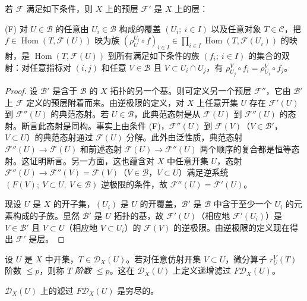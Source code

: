 \begin{lemma}
若 $\mathcal{F}$ 满足如下条件，则 $X$ 上的预层 $\mathcal{F}'$ 是 $X$ 上的层：

(F) 对 $U\in\mathcal{B}$ 的任意由 $U_i\in\mathcal{B}$ 构成的覆盖 $(U_i;\ i\in I)$ 以及任意对象 $T\in\mathcal{C}$，把 $f\in\operatorname{Hom}(T,\mathcal{F}(U))$ 映为族 $(\rho^{U_i}_U\circ f)_{i\in I}\in\prod_{i\in I}\operatorname{Hom}(T,\mathcal{F}(U_i))$ 的映射，是 $\operatorname{Hom}(T,\mathcal{F}(U))$ 到所有满足如下条件的族 $(f_i;\ i\in I)$ 的集合的双射：对任意指标对 $(i,j)$ 和任意 $V\in\mathcal{B}$ 且 $V\subset U_i\cap U_j$，有 $\rho^{V}_{U_j}\circ f_i=\rho^V_{U_i}\circ f_j$。
\end{lemma}

\begin{proof}
设 $\mathcal{B}'$ 是含于 $\mathcal{B}$ 的 $X$ 拓扑的另一个基。则可定义另一个预层 $\mathcal{F}''$，它由 $\mathcal{B}'$ 上 $\mathcal{F}$ 定义的预层附着而来。由逆极限的定义，对 $X$ 上任意开集 $U$ 存在 $\mathcal{F}'(U)$ 到 $\mathcal{F}''(U)$ 的典范态射。若 $U\in\mathcal{B}$，此典范态射是从 $\mathcal{F}(U)$ 到 $\mathcal{F}''(U)$ 的态射。断言此态射是同构。事实上由条件 (F)，$\mathcal{F}''(U)$ 到 $\mathcal{F}(V)$（$V\in\mathcal{B}'$，$V\subset U$）的典范态射通过 $\mathcal{F}(U)$ 分解。此外由泛性质，典范态射 $\mathcal{F}''(U)\to\mathcal{F}(U)$ 和前述态射 $\mathcal{F}(U)\to\mathcal{F}''(U)$ 两个顺序的复合都是恒等态射。这证明断言。另一方面，这也蕴含对 $X$ 中任意开集 $U$，态射 $\mathcal{F}''(U)\to\mathcal{F}''(V)=\mathcal{F}(V)$（$V\in\mathcal{B}$，$V\subset U$）满足逆系统 $(F(V);\ V\subset U,\ V\in\mathcal{B})$ 逆极限的条件，故 $\mathcal{F}''(U)=\mathcal{F}'(U)$。

现设 $U$ 是 $X$ 的开子集，$(U_i)$ 是 $U$ 的开覆盖，$\mathcal{B}'$ 是 $\mathcal{B}$ 中含于至少一个 $U_i$ 的元素构成的子族。显然 $\mathcal{B}'$ 是 $U$ 拓扑的基，故 $\mathcal{F}'(U)$（相应地 $\mathcal{F}'(U_i)$）是 $V\in\mathcal{B}'$ 且 $V\subset U$（相应地 $V\subset U_i$）的 $\mathcal{F}(V)$ 的逆极限。由逆极限的定义现在得出 $\mathcal{F}'$ 是层。
\end{proof}

设 $U$ 是 $X$ 中开集，$T\in\mathcal{D}_X(U)$。若对任意仿射开集 $V\subset U$，微分算子 $r^V_U(T)$ 阶数 $\le p$，则称 $T$ \emph{阶数 $\le p$}。这在 $\mathcal{D}_X(U)$ 上定义递增滤过 $F\mathcal{D}_X(U)$。

\begin{lemma}
$\mathcal{D}_X(U)$ 上的滤过 $F\mathcal{D}_X(U)$ 是穷尽的。
\end{lemma}

